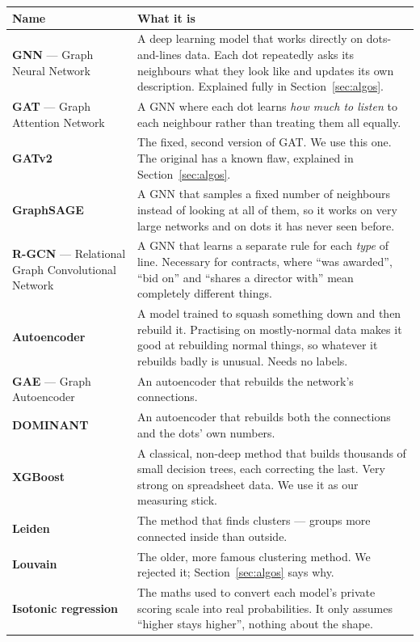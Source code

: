\documentclass[11pt,a4paper]{article}
\begin{document}
\begin{longtable}{@{}p{4.1cm}p{11.4cm}@{}}
\toprule
\textbf{Name} & \textbf{What it is} \\
\midrule
\endhead
\textbf{GNN} --- Graph Neural Network & A deep learning model that works directly
on dots-and-lines data. Each dot repeatedly asks its neighbours what they look
like and updates its own description. Explained fully in
Section~\ref{sec:algos}. \\
\textbf{GAT} --- Graph Attention Network & A GNN where each dot learns \emph{how
much to listen} to each neighbour rather than treating them all equally. \\
\textbf{GATv2} & The fixed, second version of GAT. We use this one. The original
has a known flaw, explained in Section~\ref{sec:algos}. \\
\textbf{GraphSAGE} & A GNN that samples a fixed number of neighbours instead of
looking at all of them, so it works on very large networks and on dots it has
never seen before. \\
\textbf{R-GCN} --- Relational Graph Convolutional Network & A GNN that learns a
separate rule for each \emph{type} of line. Necessary for contracts, where ``was
awarded'', ``bid on'' and ``shares a director with'' mean completely different
things. \\
\textbf{Autoencoder} & A model trained to squash something down and then rebuild
it. Practising on mostly-normal data makes it good at rebuilding normal things,
so whatever it rebuilds badly is unusual. Needs no labels. \\
\textbf{GAE} --- Graph Autoencoder & An autoencoder that rebuilds the network's
connections. \\
\textbf{DOMINANT} & An autoencoder that rebuilds both the connections and the
dots' own numbers. \\
\textbf{XGBoost} & A classical, non-deep method that builds thousands of small
decision trees, each correcting the last. Very strong on spreadsheet data. We use
it as our measuring stick. \\
\textbf{Leiden} & The method that finds clusters --- groups more connected inside
than outside. \\
\textbf{Louvain} & The older, more famous clustering method. We rejected it;
Section~\ref{sec:algos} says why. \\
\textbf{Isotonic regression} & The maths used to convert each model's private
scoring scale into real probabilities. It only assumes ``higher stays higher'',
nothing about the shape. \\

\end{longtable}
\end{document}
